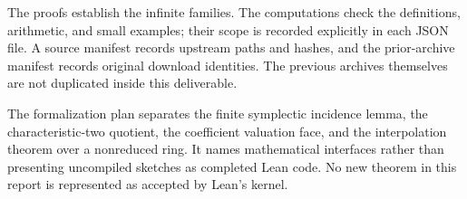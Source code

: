 The proofs establish the infinite families. The computations check the definitions, arithmetic, and small examples; their scope is recorded explicitly in each JSON file. A source manifest records upstream paths and hashes, and the prior-archive manifest records original download identities. The previous archives themselves are not duplicated inside this deliverable.

The formalization plan separates the finite symplectic incidence lemma, the characteristic-two quotient, the coefficient valuation face, and the interpolation theorem over a nonreduced ring. It names mathematical interfaces rather than presenting uncompiled sketches as completed Lean code. No new theorem in this report is represented as accepted by Lean's kernel.
